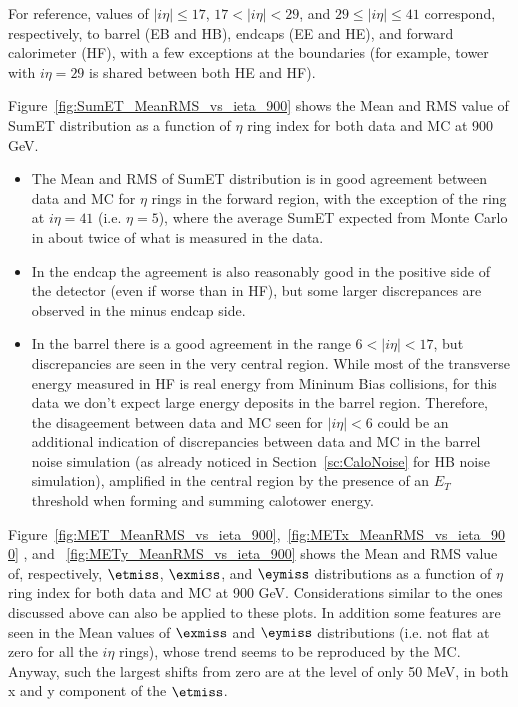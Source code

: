 For reference, values of $|i\eta|\le17$, $17<|i\eta|<29$, and $29\le|i\eta|\le41$ 
correspond, respectively, to barrel (EB and HB), endcaps (EE and HE), and forward 
calorimeter (HF), with a few exceptions at the boundaries 
(for example, tower with $i\eta=29$ is shared between both HE and HF).

Figure~\ref{fig:SumET_MeanRMS_vs_ieta_900} shows the Mean and RMS value of 
SumET distribution as a function of $\eta$ ring index for both data and MC at 900 GeV.
\begin{itemize}
\item The Mean and RMS of SumET distribution is in good agreement between 
data and MC for $\eta$ rings in the forward region, with the exception 
of the ring at $i\eta=41$ (i.e. $\eta=5$), where the average SumET expected from Monte Carlo 
in about twice of what is measured in the data.
\item In the endcap the agreement is also reasonably good in the positive 
side of the detector (even if worse than in HF), 
but some larger discrepances are observed in the minus endcap side. 
\item In the barrel there is a good agreement in the range $6<|i\eta|<17$, 
but discrepancies are seen in the very central region. 
While most of the transverse energy measured in HF 
is real energy from Mininum Bias collisions, for this data we don't expect 
large energy deposits in the barrel region. 
Therefore, the disageement between data and MC seen for $|i\eta|<6$
could be an additional indication of discrepancies between data and MC in 
the barrel noise simulation (as already noticed in Section~\ref{sc:CaloNoise} 
for HB noise simulation), amplified in the central region by 
the presence of an $E_{T}$ threshold when forming and summing calotower energy. 
\end{itemize}

Figure~\ref{fig:MET_MeanRMS_vs_ieta_900},~\ref{fig:METx_MeanRMS_vs_ieta_900}
, and ~\ref{fig:METy_MeanRMS_vs_ieta_900} shows the Mean and RMS value of, respectively,
$\etmiss$, $\exmiss$, and $\eymiss$ distributions as a function of $\eta$ ring 
index for both data and MC at 900 GeV.
Considerations similar to the ones discussed above can also be applied to these plots.
In addition some features are seen in the Mean values of $\exmiss$ and $\eymiss$ distributions
(i.e. not flat at zero for all the $i\eta$ rings), whose trend seems to be reproduced by the MC.
Anyway, such the largest shifts from zero are at the level of only 50 MeV, in both x and y component 
of the $\etmiss$.

